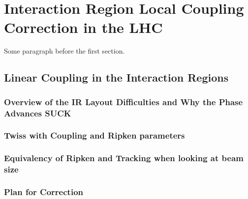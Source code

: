 
\chapter{Interaction Region Local Coupling Correction in the LHC} %

\label{Chapter4} %




Some paragraph before the first section.


\section{Linear Coupling in the Interaction Regions}

\subsection{Overview of the IR Layout Difficulties and Why the Phase Advances SUCK}

\subsection{Twiss with Coupling and Ripken parameters}

\subsection{Equivalency of Ripken and Tracking when looking at beam size}

\subsection{Plan for Correction}



